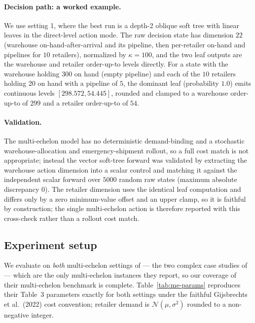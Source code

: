\documentclass[11pt]{article}
\begin{document}
\paragraph{Decision path: a worked example.}
We use setting 1, where the best run is a depth-2 oblique soft tree with
linear leaves in the direct-level action mode. The raw decision state has dimension $22$ (warehouse
on-hand-after-arrival and its pipeline, then per-retailer on-hand and pipelines for $10$ retailers),
normalized by $\kappa=100$, and the two leaf outputs are the warehouse and retailer
order-up-to levels directly. For a state with the warehouse holding $300$ on hand (empty pipeline) and
each of the $10$ retailers holding $20$ on hand with a pipeline of $5$, the dominant leaf (probability
$1.0$) emits continuous levels $[298.572,54.445]$, rounded and clamped to a warehouse order-up-to of
$299$ and a retailer order-up-to of $54$.

\paragraph{Validation.}
The multi-echelon model has no deterministic demand-binding and a stochastic
warehouse-allocation and emergency-shipment rollout, so a full cost match is not appropriate; instead
the vector soft-tree forward was validated by extracting the warehouse action dimension into a scalar
control and matching it against the independent scalar forward over $5000$ random raw states
(maximum absolute discrepancy $0$). The retailer dimension uses the identical leaf computation and
differs only by a zero minimum-value offset and an upper clamp, so it is faithful by construction; the
single multi-echelon action is therefore reported with this cross-check rather than a rollout cost
match.

\subsection{Experiment setup}

We evaluate on \emph{both} multi-echelon settings of \citet{gijsbrechts2022drl} --- the two complex
case studies of \citet{vanroy1997ndp} --- which are the only multi-echelon instances they report, so
our coverage of their multi-echelon benchmark is complete. Table~\ref{tab:me-params} reproduces
their Table~3 parameters exactly for both settings under the faithful Gijsbrechts et al.\ (2022) cost
convention; retailer demand is $\mathcal{N}(\mu,\sigma^2)$ rounded to a non-negative integer.
\end{document}
